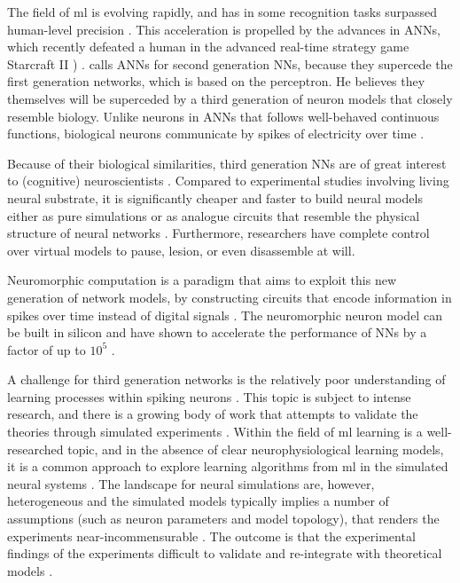 

The field of \gls{ml} is evolving rapidly, and has in
some recognition tasks surpassed human-level precision
\autocite{Schmidhuber2014}.
This acceleration is propelled by the advances in \glspl{ANN}, 
which recently defeated a human in the
advanced real-time strategy game Starcraft II \cite{DeepMind2019})
\autocite{Schmidhuber2014, Nilsson2009, Russel2007}.
\citeauthor{Maass1997} calls \glspl{ANN} for second generation
\glspl{NN}, because they supercede the first generation networks, which
is based on the perceptron.
He believes they themselves will be superceded by a third generation of neuron
models that closely resemble biology.
Unlike neurons in \glspl{ANN} that follows well-behaved continuous
functions, biological neurons communicate by spikes of
electricity over time
\cite{Maass1997}.

Because of their biological similarities, third generation 
\glspl{NN} are of great interest to (cognitive) neuroscientists
\autocite{Dayan2001,Bruderle2011,Eliasmith2015}.
Compared to experimental studies involving living neural substrate,
it is significantly cheaper and faster to build neural 
models either as pure simulations
\autocite{Davison2009, Eliasmith2015} or as analogue circuits
that resemble the physical structure of neural networks
\autocite{Walter2015, Schmitt2017}.
Furthermore, researchers have complete control over virtual models
to pause, lesion, or even disassemble at will.

Neuromorphic computation is a paradigm that aims to exploit this new
generation of network models, by constructing circuits that encode information
in spikes over time instead of digital signals \cite{Eliasmith2015, Albada2018}.
The neuromorphic neuron model can be built in
silicon and have shown to accelerate the performance of \glspl{NN}
by a factor of up to $10^5$ \cite{Albada2018, Schmitt2017}.

A challenge for third generation networks is the relatively
poor understanding of learning processes within spiking neurons \autocite{Tavanei2015,
Walter2015}.
This topic is subject to intense research, and there is a growing body of work
that attempts to validate the theories through simulated experiments 
\cite{Indiveri2015, Tavanaei2019}.
Within the field of \gls{ml} learning is a well-researched topic, and in the
absence of clear neurophysiological learning models, it is a common approach to 
explore learning algorithms from \gls{ml} in the simulated neural systems
\cite{Lee2016,Schmitt2017,Walter2015,Diehl2015,Rueckauer2017}.
The landscape for neural simulations are, however, heterogeneous and the
simulated models typically implies a number of assumptions (such as neuron
parameters and model topology), that renders the experiments near-incommensurable
\cite{Albada2018, Lee2016, Rueckauer2017}.
The outcome is that the experimental findings of the experiments difficult to validate
and re-integrate with theoretical models \autocite{Rueckauer2017, Albada2018,
Bruderle2011}.

